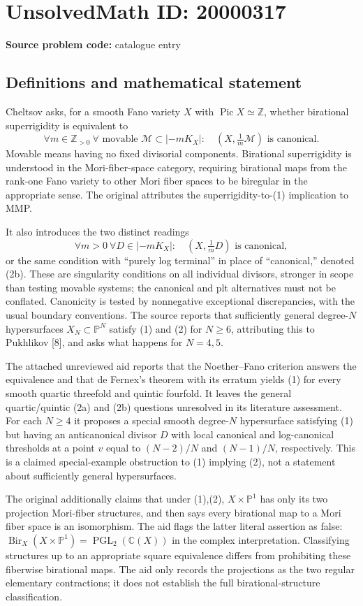 \documentclass[11pt]{article}
\newcommand{\Z}{\mathbb{Z}}
\newcommand{\C}{\mathbb{C}}
\newcommand{\PP}{\mathbb{P}}
\begin{document}
\section*{UnsolvedMath ID: 20000317}
\textbf{Source problem code:} catalogue entry
\subsection{Definitions and mathematical statement}
Cheltsov asks, for a smooth Fano variety $X$ with $\operatorname{Pic}X\simeq\Z$, whether birational superrigidity is equivalent to
\[
\forall m\in\Z_{>0}\ \forall\text{ movable }\mathcal M\subset|-mK_X|:
\quad(X,\tfrac1m\mathcal M)\text{ is canonical}.\tag{1}
\]
Movable means having no fixed divisorial components. Birational superrigidity is understood in the Mori-fiber-space category, requiring birational maps from the rank-one Fano variety to other Mori fiber spaces to be biregular in the appropriate sense. The original attributes the superrigidity-to-(1) implication to MMP.

It also introduces the two distinct readings
\[
\forall m>0\ \forall D\in|-mK_X|:\quad
(X,\tfrac1mD)\text{ is canonical},\tag{2a}
\]
or the same condition with ``purely log terminal'' in place of ``canonical,'' denoted (2b). These are singularity conditions on all individual divisors, stronger in scope than testing movable systems; the canonical and plt alternatives must not be conflated. Canonicity is tested by nonnegative exceptional discrepancies, with the usual boundary conventions. The source reports that sufficiently general degree-$N$ hypersurfaces $X_N\subset\PP^N$ satisfy (1) and (2) for $N\ge6$, attributing this to Pukhlikov [8], and asks what happens for $N=4,5$.

The attached unreviewed aid reports that the Noether--Fano criterion answers the equivalence and that de Fernex's theorem with its erratum yields (1) for every smooth quartic threefold and quintic fourfold. It leaves the general quartic/quintic (2a) and (2b) questions unresolved in its literature assessment. For each $N\ge4$ it proposes a special smooth degree-$N$ hypersurface satisfying (1) but having an anticanonical divisor $D$ with local canonical and log-canonical thresholds at a point $v$ equal to $(N-2)/N$ and $(N-1)/N$, respectively. This is a claimed special-example obstruction to (1) implying (2), not a statement about sufficiently general hypersurfaces.

The original additionally claims that under (1),(2), $X\times\PP^1$ has only its two projection Mori-fiber structures, and then says every birational map to a Mori fiber space is an isomorphism. The aid flags the latter literal assertion as false: $\operatorname{Bir}_X(X\times\PP^1)=\operatorname{PGL}_2(\C(X))$ in the complex interpretation. Classifying structures up to an appropriate square equivalence differs from prohibiting these fiberwise birational maps. The aid only records the projections as the two regular elementary contractions; it does not establish the full birational-structure classification.
\end{document}
